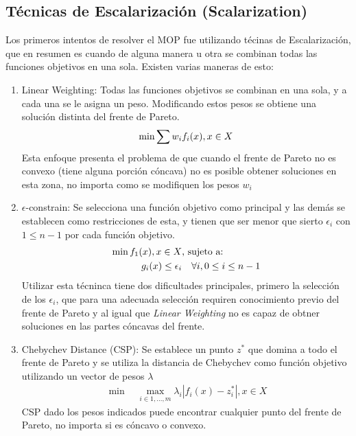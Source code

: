 \subsection{T\'ecnicas de Escalarizaci\'on (Scalarization)}
Los primeros intentos de resolver el MOP fue utilizando t\'ecinas de Escalarizaci\'on, que en resumen es cuando de alguna manera u otra se combinan todas las funciones objetivos en una sola. Existen varias maneras de esto:
\begin{enumerate}
    \item Linear Weighting: Todas las funciones objetivos se combinan en una sola, y a cada una se le asigna un peso. Modificando estos pesos se obtiene una soluci\'on distinta del frente de Pareto.\\
    \begin{align*}
        \min \sum w_i f_i(x), \space x \in X
    \end{align*}
    Esta enfoque presenta el problema de que cuando el frente de Pareto no es convexo (tiene alguna porci\'on c\'oncava) no es posible obtener soluciones en esta zona, no importa como se modifiquen los pesos $w_i$

    \item $\epsilon$-constrain: Se selecciona una funci\'on objetivo como principal y las dem\'as se establecen como restricciones de esta, y tienen que ser menor que sierto $\epsilon_i$ con $1 \leq n - 1$ por cada funci\'on objetivo.
    \begin{align*}
            \min  f_1(x), \space x \in X  & \text{, sujeto a:}   \\
            g_i(x) \leq \epsilon_i & \quad  \forall i, 0 \leq i \leq n - 1
    \end{align*}
    Utilizar esta t\'ecninca tiene dos dificultades principales, primero la selecci\'on de los $\epsilon_i$, que para una adecuada selecci\'on requiren conocimiento previo del frente de Pareto y al igual que \textit{Linear Weighting} no es capaz de obtner soluciones en las partes c\'oncavas del frente.

    \item Chebychev Distance (CSP): Se establece un punto $z^*$ que domina a todo el frente de Pareto y se utiliza la distancia de Chebychev como funci\'on objetivo utilizando un vector de pesos $\lambda$
    \begin{align*}
        \min \quad \max_{i \in {1,...,m}} \lambda_i |f_i(x) - z^*_i|, x \in X 
    \end{align*}
    CSP dado los pesos indicados puede encontrar cualquier punto del frente de Pareto, no importa si es c\'oncavo o convexo.

\end{enumerate}

